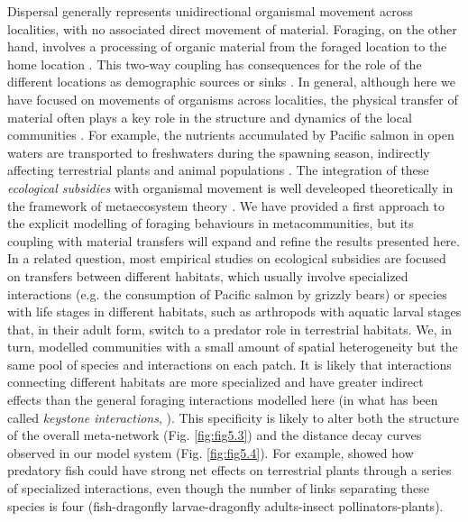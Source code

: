 Dispersal generally represents unidirectional organismal movement across localities, with no associated direct movement of material. Foraging, on the other hand, involves a processing of organic material from the foraged location to the home location \citep{Gounand2018}. This two-way coupling has consequences for the role of the different locations as demographic sources or sinks \citep{Gravel2010}. In general, although here we have focused on movements of organisms across localities, the physical transfer of material often plays a key role in the structure and dynamics of the local communities \citep{Polis1997}. For example, the nutrients accumulated by Pacific salmon in open waters are transported to freshwaters during the spawning season, indirectly affecting terrestrial plants and animal populations \citep{Naiman2002, Levi2012}. The integration of these \textit{ecological subsidies} with organismal movement is well develeoped theoretically in the framework of metaecosystem theory \citep{Loreau2003, Gounand2018}. We have provided a first approach to the explicit modelling of foraging behaviours in metacommunities, but its coupling with material transfers will expand and refine the results presented here. In a related question, most empirical studies on ecological subsidies are focused on transfers between different habitats, which usually involve specialized interactions (e.g. the consumption of Pacific salmon by grizzly bears) or species with life stages in different habitats, such as arthropods with aquatic larval stages that, in their adult form, switch to a predator role in terrestrial habitats. We, in turn, modelled communities with a small amount of spatial heterogeneity but the same pool of species and interactions on each patch. It is likely that interactions connecting different habitats are more specialized and have greater indirect effects than the general foraging interactions modelled here (in what has been called \textit{keystone interactions}, \citealt{Helfield2006}). This specificity is likely to alter both the structure of the overall meta-network (Fig. \ref{fig:fig5.3}) and the distance decay curves observed in our model system (Fig. \ref{fig:fig5.4}). For example, \cite{Knight2005} showed how predatory fish could have strong net effects on terrestrial plants through a series of specialized interactions, even though the number of links separating these species is four (fish-dragonfly larvae-dragonfly adults-insect pollinators-plants).

